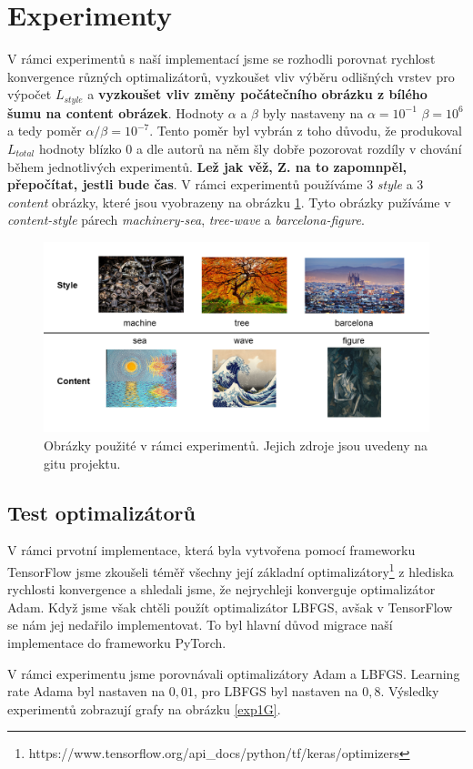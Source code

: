 \documentclass[twocolumn]{article}
\begin{document}
	\section*{Experimenty}
	V rámci experimentů s naší implementací jsme se rozhodli porovnat rychlost konvergence různých optimalizátorů, vyzkoušet vliv výběru odlišných vrstev pro výpočet $L_{style}$ a \textbf{vyzkoušet vliv změny počátečního obrázku z bílého šumu na content obrázek}. Hodnoty $\alpha$ a $\beta$ byly nastaveny na $\alpha = 10^{-1}$ $\beta = 10^6$ a tedy poměr $\alpha / \beta = 10^{-7} $. Tento poměr byl vybrán z toho důvodu, že produkoval $L_{total}$ hodnoty blízko 0 a dle autorů na něm šly  dobře pozorovat rozdíly v chování během jednotlivých experimentů. \textbf{Lež jak věž, Z. na to zapomnpěl, přepočítat, jestli bude čas}. V rámci experimentů používáme 3 \textit{style} a 3 \textit{content} obrázky, které jsou vyobrazeny na obrázku \ref{UsedFigs}. Tyto obrázky pužíváme v \textit{content-style} párech \textit{machinery-sea}, \textit{tree-wave} a \textit{barcelona-figure}.
	\begin{figure}[h]
		\includegraphics[width=\linewidth]{figs.png}
		\caption{Obrázky použité v rámci experimentů. Jejich zdroje jsou uvedeny na gitu projektu.}
		\label{UsedFigs}
	\end{figure}
	
	
	\subsection*{Test optimalizátorů}
	V rámci prvotní implementace, která byla vytvořena pomocí frameworku TensorFlow jsme zkoušeli téměř všechny její základní optimalizátory\footnote{https://www.tensorflow.org/api\_docs/python/tf/keras/optimizers} z hlediska rychlosti konvergence a shledali jsme, že nejrychleji konverguje optimalizátor Adam. Když jsme však chtěli použít optimalizátor LBFGS, avšak v TensorFlow se nám jej nedařilo implementovat. To byl hlavní důvod migrace naší implementace do frameworku PyTorch.
	\par
	V rámci experimentu jsme porovnávali optimalizátory Adam a LBFGS. Learning rate Adama byl nastaven na $0,01$, pro LBFGS byl nastaven na $0,8$. Výsledky experimentů zobrazují grafy na obrázku \ref{exp1G}.
	
\end{document}
